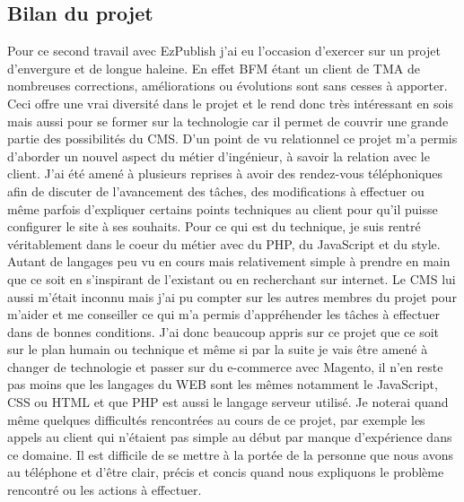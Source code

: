 \documentclass[a4paper,11pt,twoside]{report}
\begin{document}
    \subsection*{Bilan du projet}
    Pour ce second travail avec EzPublish j'ai eu l'occasion d'exercer sur un projet d'envergure et de longue haleine. En effet BFM étant un client de TMA de nombreuses corrections, améliorations ou évolutions sont sans cesses à apporter. Ceci offre une vrai diversité dans le projet et le rend donc très intéressant en sois mais aussi pour se former sur la technologie car il permet de couvrir une grande partie des possibilités du CMS. 
    D'un point de vu relationnel ce projet m'a permis d'aborder un nouvel aspect du métier d'ingénieur, à savoir la relation avec le client. J'ai été amené à plusieurs reprises à avoir des rendez-vous téléphoniques afin de discuter de l'avancement des tâches, des modifications à effectuer ou même parfois d'expliquer certains points techniques au client pour qu'il puisse configurer le site à ses souhaits. 
    Pour ce qui est du technique, je suis rentré véritablement dans le coeur du métier avec du PHP, du JavaScript et du style. Autant de langages peu vu en cours mais relativement simple à prendre en main que ce soit en s'inspirant de l'existant ou en recherchant sur internet. Le CMS lui aussi m'était inconnu mais j'ai pu compter sur les autres membres du projet pour m'aider et me conseiller ce qui m'a permis d'appréhender les tâches à effectuer dans de bonnes conditions. J'ai donc beaucoup appris sur ce projet que ce soit sur le plan humain ou technique et même si par la suite je vais être amené à changer de technologie et passer sur du e-commerce avec Magento, il n'en reste pas moins que les langages du WEB sont les mêmes notamment le JavaScript, CSS ou HTML et que PHP est aussi le langage serveur utilisé. 
    Je noterai quand même quelques difficultés rencontrées au cours de ce projet, par exemple les appels au client qui n'étaient pas simple au début par manque d'expérience dans ce domaine. Il est difficile de se mettre à la portée de la personne que nous avons au téléphone et d'être clair, précis et concis quand nous expliquons le problème rencontré ou les actions à effectuer. 
\end{document}
